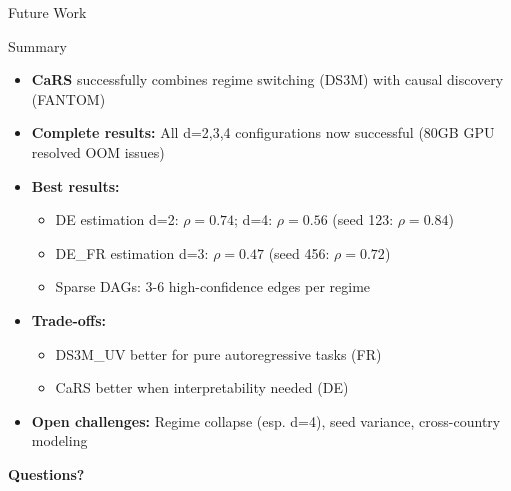 \documentclass[aspectratio=169]{beamer}
\begin{document}
\begin{frame}{Future Work}
\vspace{0.3cm}
\begin{center}
\end{center}
\end{frame}

\begin{frame}{Summary}
\begin{itemize}
    \item \textbf{CaRS} successfully combines regime switching (DS3M) with causal discovery (FANTOM)

    \item \textbf{Complete results:} All d=2,3,4 configurations now successful (80GB GPU resolved OOM issues)

    \item \textbf{Best results:}
    \begin{itemize}
        \item DE estimation d=2: $\rho = 0.74$; d=4: $\rho = 0.56$ (seed 123: $\rho = 0.84$)
        \item DE\_FR estimation d=3: $\rho = 0.47$ (seed 456: $\rho = 0.72$)
        \item Sparse DAGs: 3-6 high-confidence edges per regime
    \end{itemize}

    \item \textbf{Trade-offs:}
    \begin{itemize}
        \item DS3M\_UV better for pure autoregressive tasks (FR)
        \item CaRS better when interpretability needed (DE)
    \end{itemize}

    \item \textbf{Open challenges:} Regime collapse (esp. d=4), seed variance, cross-country modeling
\end{itemize}

\vspace{0.5cm}
\begin{center}
\Large\textbf{Questions?}
\end{center}
\end{frame}
\end{document}
